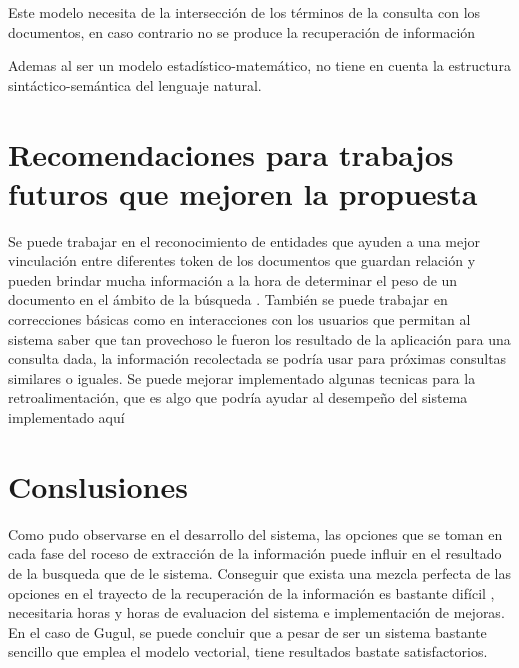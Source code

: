 \documentclass{llncs}
\begin{document}
	Este modelo necesita de la intersecci\'on de los t\'erminos de la consulta con los documentos, en caso contrario no se produce la recuperaci\'on de informaci\'on
	
	Ademas al ser un modelo estad\'istico-matem\'atico, no tiene en cuenta la estructura sintáctico-semántica del lenguaje natural.
	
	\section{Recomendaciones para trabajos futuros que mejoren la propuesta}
	
	 Se puede trabajar en el reconocimiento de entidades que ayuden a una mejor vinculaci\'on entre diferentes token de los documentos que guardan relaci\'on y pueden brindar mucha informaci\'on a la hora de determinar el peso de un documento en el \'ambito de la b\'usqueda . Tambi\'en se puede trabajar en correcciones b\'asicas como en interacciones con los usuarios que permitan al sistema saber que tan provechoso le fueron los resultado de la aplicaci\'on para una consulta dada, la informaci\'on recolectada se podr\'ia usar para pr\'oximas consultas similares o iguales. Se puede mejorar implementado algunas tecnicas para la retroalimentaci\'on, que es algo que podr\'ia ayudar al desempe\~no del sistema implementado aqu\'i 
	
	
	\section*{Conslusiones} 
	
	Como pudo observarse en el desarrollo del sistema, las opciones que se toman en cada fase del roceso de extracci\'on de la informaci\'on puede influir en el resultado de la busqueda que de le sistema. Conseguir que exista una mezcla perfecta de las opciones en el trayecto de la recuperaci\'on de la informaci\'on es bastante dif\'icil , necesitaria horas y horas de evaluacion del sistema e implementaci\'on de mejoras. En el caso de Gugul, se puede concluir que a pesar de ser un sistema bastante sencillo que emplea el modelo vectorial, tiene resultados bastate satisfactorios. 
	
\end{document}
